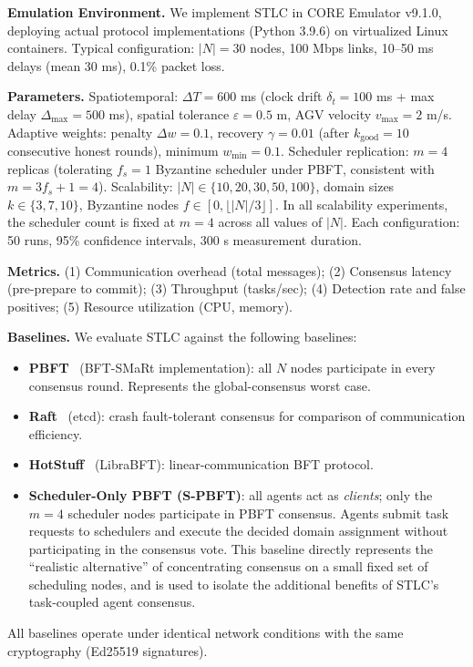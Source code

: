 \documentclass[manuscript,screen,review]{acmart}
\begin{document}
\textbf{Emulation Environment.} We implement STLC in CORE Emulator v9.1.0, deploying actual protocol implementations (Python 3.9.6) on virtualized Linux containers. Typical configuration: $|N|=30$ nodes, 100 Mbps links, 10--50 ms delays (mean 30 ms), 0.1\% packet loss.

\textbf{Parameters.} Spatiotemporal: $\Delta T = 600$ ms (clock drift $\delta_t = 100$ ms + max delay $\Delta_{\max} = 500$ ms), spatial tolerance $\varepsilon = 0.5$ m, AGV velocity $v_{\max} = 2$ m/s. Adaptive weights: penalty $\Delta w = 0.1$, recovery $\gamma = 0.01$ (after $k_{\text{good}} = 10$ consecutive honest rounds), minimum $w_{\min} = 0.1$. Scheduler replication: $m = 4$ replicas (tolerating $f_s = 1$ Byzantine scheduler under PBFT, consistent with $m = 3f_s + 1 = 4$). Scalability: $|N| \in \{10, 20, 30, 50, 100\}$, domain sizes $k \in \{3, 7, 10\}$, Byzantine nodes $f \in [0, \lfloor |N|/3 \rfloor]$. In all scalability experiments, the scheduler count is fixed at $m = 4$ across all values of $|N|$. Each configuration: 50 runs, 95\% confidence intervals, 300 s measurement duration.

\textbf{Metrics.} (1) Communication overhead (total messages); (2) Consensus latency (pre-prepare to commit); (3) Throughput (tasks/sec); (4) Detection rate and false positives; (5) Resource utilization (CPU, memory).

\textbf{Baselines.} We evaluate STLC against the following baselines:
\begin{itemize}
    \item \textbf{PBFT}~\cite{bessani2014state} (BFT-SMaRt implementation): all $N$ nodes participate in every consensus round. Represents the global-consensus worst case.
    \item \textbf{Raft}~\cite{tsaliki2024accelerating} (etcd): crash fault-tolerant consensus for comparison of communication efficiency.
    \item \textbf{HotStuff}~\cite{carr2022towards} (LibraBFT): linear-communication BFT protocol.
    \item \textbf{Scheduler-Only PBFT (S-PBFT)}: all agents act as \emph{clients}; only the $m = 4$ scheduler nodes participate in PBFT consensus. Agents submit task requests to schedulers and execute the decided domain assignment without participating in the consensus vote. This baseline directly represents the ``realistic alternative'' of concentrating consensus on a small fixed set of scheduling nodes, and is used to isolate the additional benefits of STLC's task-coupled agent consensus.
\end{itemize}
All baselines operate under identical network conditions with the same cryptography (Ed25519 signatures).
\end{document}
